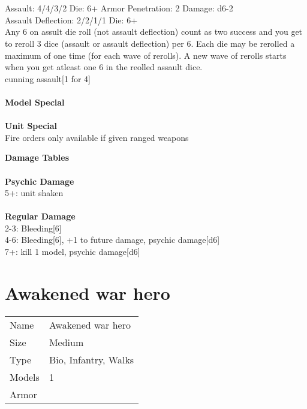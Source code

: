 \ \\

\ \\
Assault: 4/4/3/2 Die: 6+ Armor Penetration: 2 Damage: d6-2 \\
Assault Deflection: 2/2/1/1 Die: 6+\\
\indent Any 6 on assult die roll (not assault deflection) count as two success and you get to reroll 3 dice (assault or assault deflection) per 6. Each die may be rerolled a maximum of one time (for each wave of rerolls). A new wave of rerolls starts when you get atleast one 6 in the reolled assault dice.\\ cunning assault[1 for 4] \\
\ \\
{\bf Model Special} \\

\ \\



{\bf Unit Special} \\
Fire orders only available if given ranged weapons

{\bf Damage Tables} \\
\ \\ {\bf Psychic Damage } \\
5+: unit shaken \\
\ \\ {\bf Regular Damage } \\
2-3: Bleeding[6] \\
4-6: Bleeding[6], +1 to future damage, psychic damage[d6] \\
7+: kill 1 model, psychic damage[d6] \\










\pagebreak

\section{ Awakened war hero }

\begin{tabular}{ll}
  Name & Awakened war hero \\
  Size & Medium\\
  Type & Bio, Infantry, Walks\\
  Models & 1\\
  Armor & \\
\end{tabular}



